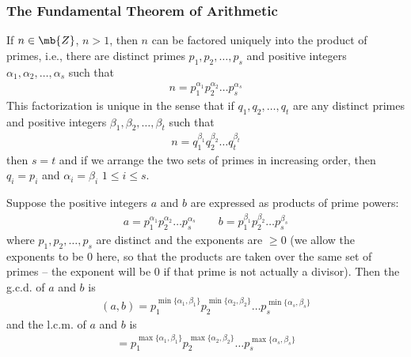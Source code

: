 \subsubsection{The Fundamental Theorem of Arithmetic}
If $n\in\mb{Z}$, $n>1$, then $n$ can be factored uniquely into the product of primes, i.e., there are distinct primes
$p_{1}, p_{2}, \dots, p_{s}$ and positive integers $\alpha_{1}, \alpha_{2},\dots,\alpha_{s}$ such that
\begin{align*}
    n = p_{1}^{\alpha_{1}}p_{2}^{\alpha_{2}}\dots p_{s}^{\alpha_{s}}
\end{align*}
This factorization is unique in the sense that if $q_{1},q_{2},\dots,q_{t}$ are any distinct
primes and positive integers $\beta_{1},\beta_{2},\dots,\beta_{t}$ such that
\begin{align*}
    n = q_{1}^{\beta_{1}}q_{2}^{\beta_{2}}\dots q_{t}^{\beta_{t}}
\end{align*}
then $s=t$ and if we arrange the two sets of primes in increasing order, then $q_{i} = p_{i}$
and $\alpha_{i} = \beta_{i}$ $1\le i\le s$.

Suppose the positive integers $a$ and $b$ are expressed as products of prime powers:
\begin{align*}
    a = p_{1}^{\alpha_{1}}p_{2}^{\alpha_{2}}\dots p_{s}^{\alpha_{s}} \qquad b = p_{1}^{\beta_{1}}p_{2}^{\beta_{2}}\dots p_{s}^{\beta_{s}}
\end{align*}
where $p_{1}, p_{2}, \dots, p_{s}$ are distinct and the exponents are $\ge 0$
(we allow the exponents to be $0$ here, so that the products are taken over the same set of primes -- the exponent will be $0$ if that prime is not actually a divisor).
Then the g.c.d. of $a$ and $b$ is
\begin{align*}
    (a,b) = p_{1}^{\min\{\alpha_{1}, \beta_{1}\}}p_{2}^{\min\{\alpha_{2}, \beta_{2}\}}\dots p_{s}^{\min\{\alpha_{s}, \beta_{s}\}}
\end{align*}
and the l.c.m. of $a$ and $b$ is
\begin{align*}
    [a,b] = p_{1}^{\max\{\alpha_{1}, \beta_{1}\}}p_{2}^{\max\{\alpha_{2}, \beta_{2}\}}\dots p_{s}^{\max\{\alpha_{s}, \beta_{s}\}}
\end{align*}
\newpage
\thispagestyle{oddpagestyle}

